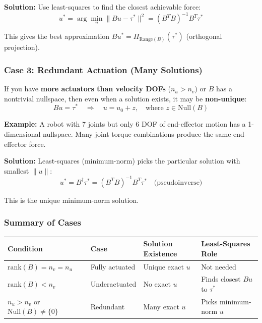 \textbf{Solution:} Use least-squares to find the closest achievable force:
\begin{equation}
u^* = \arg\min_u \|Bu - \tau^*\|^2 = (B^TB)^{-1}B^T\tau^*
\end{equation}

This gives the best approximation $Bu^* = \Pi_{\text{Range}(B)}(\tau^*)$ (orthogonal projection).

\subsubsection*{Case 3: Redundant Actuation (Many Solutions)}

If you have \textbf{more actuators than velocity DOFs} ($n_u > n_v$) or $B$ has a nontrivial nullspace, then even when a solution exists, it may be \textbf{non-unique}:
\begin{equation}
Bu = \tau^* \quad \Rightarrow \quad u = u_0 + z, \quad \text{where } z \in \text{Null}(B)
\end{equation}

\textbf{Example:} A robot with 7 joints but only 6 DOF of end-effector motion has a 1-dimensional nullspace. Many joint torque combinations produce the same end-effector force.

\textbf{Solution:} Least-squares (minimum-norm) picks the particular solution with smallest $\|u\|$:
\begin{equation}
u^* = B^{\dagger}\tau^* = (B^TB)^{-1}B^T\tau^* \quad \text{(pseudoinverse)}
\end{equation}

This is the unique minimum-norm solution.

\subsubsection*{Summary of Cases}

\begin{tabular}{|l|l|l|l|}
\hline
\textbf{Condition} & \textbf{Case} & \textbf{Solution Existence} & \textbf{Least-Squares Role} \\
\hline
$\text{rank}(B) = n_v = n_u$ & Fully actuated & Unique exact $u$ & Not needed \\
\hline
$\text{rank}(B) < n_v$ & Underactuated & No exact $u$ & Finds closest $Bu$ to $\tau^*$ \\
\hline
$n_u > n_v$ or $\text{Null}(B) \neq \{0\}$ & Redundant & Many exact $u$ & Picks minimum-norm $u$ \\
\hline
\end{tabular}

